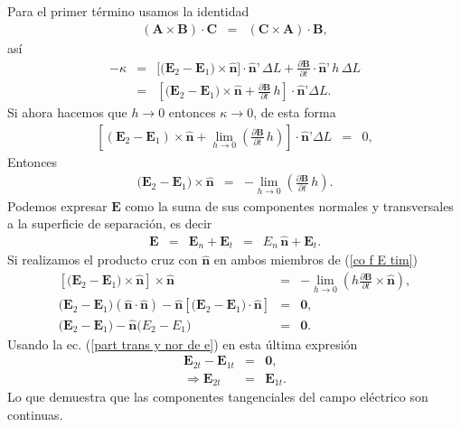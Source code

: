 Para el primer t\'ermino usamos la identidad
\begin{eqnarray}
(\textbf{A}\times\textbf{B})\cdot\textbf{C}&=&(\textbf{C}\times\textbf{A})\cdot\textbf{B},
\end{eqnarray}
as\'i
\begin{eqnarray}
-\kappa&=&\big[\big(\textbf{E}_2-\textbf{E}_1\big)\times\hat{\textbf{n}}\big]\cdot\hat{\textbf{n}}\textbf{'}\,\Delta L+\frac{\partial\textbf{B}}{\partial t}\cdot\hat{\textbf{n}}\textbf{'}\,h\,\Delta L\nonumber\\
&=&\left[ \big(\textbf{E}_2-\textbf{E}_1\big)\times\hat{\textbf{n}}+\frac{\partial\textbf{B}}{\partial t}\,h\right] \cdot\hat{\textbf{n}}\textbf{'}\Delta L.
\end{eqnarray}
Si ahora hacemos que $h\rightarrow 0$ entonces $\kappa\rightarrow 0$, de esta forma
\begin{eqnarray}
\left[ \left( \textbf{E}_2-\textbf{E}_1\right) \times\hat{\textbf{n}}+\lim_{h\rightarrow 0}\left( \frac{\partial\textbf{B}}{\partial t}\,h\right) \right] \cdot\hat{\textbf{n}}\textbf{'}\Delta L&=&0,
\end{eqnarray}
Entonces
\begin{eqnarray}
\big(\textbf{E}_2-\textbf{E}_1\big)\times\hat{\textbf{n}}&=&-\lim_{h\rightarrow 0}\left( \frac{\partial\textbf{B}}{\partial t}\,h\right).\label{co f E tim}
\end{eqnarray}
Podemos expresar $\textbf{E}$ como la suma de sus componentes normales y transversales a la superficie de separaci\'on, es decir
\begin{eqnarray}
\textbf{E}&=&\textbf{E}_n+\textbf{E}_t\,\,\,=\,\,\,E_n\,\hat{\textbf{n}}+\textbf{E}_t.\label{part trans y nor de e}
\end{eqnarray}
Si realizamos el producto cruz con $\hat{\textbf{n}}$ en ambos miembros de (\ref{co f E tim})
\begin{eqnarray}
\left[ \big(\textbf{E}_{2}-\textbf{E}_{1}\big)\times\hat{\textbf{n}}\right] \times\hat{\textbf{n}}&=&-\lim_{h\rightarrow 0}\left( h\frac{\partial\textbf{B}}{\partial t}\times\hat{\textbf{n}}\right),\nonumber\\
\big(\textbf{E}_{2}-\textbf{E}_{1}\big)(\hat{\textbf{n}}\cdot\hat{\textbf{n}})-\hat{\textbf{n}}\left[ \big(\textbf{E}_{2}-\textbf{E}_{1}\big)\cdot \hat{\textbf{n}}\right]&=&\textbf{0},\nonumber\\
\big(\textbf{E}_{2}-\textbf{E}_{1}\big)-\hat{\textbf{n}}\big(E_{2}-E_{1}\big)&=&\textbf{0}.
\end{eqnarray}
Usando la ec. (\ref{part trans y nor de e}) en esta \'ultima expresi\'on
\begin{eqnarray}
\textbf{E}_{2t}-\textbf{E}_{1t}&=&\textbf{0},\nonumber\\
\Rightarrow\textbf{E}_{2t}&=&\textbf{E}_{1t}.
\end{eqnarray}
Lo que demuestra que las componentes tangenciales del campo el\'ectrico son continuas.



